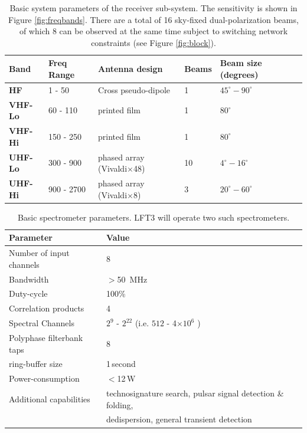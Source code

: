 \begin{table}
    \centering
    \caption{Basic system parameters of the receiver sub-system.  The sensitivity is shown in Figure \ref{fig:freqbands}. There are a total of 16 sky-fixed dual-polarization beams, of which 8 can be observed at the same time subject to switching network constraints (see Figure \ref{fig:block}).}
    \label{tab:bandparam}
    \begin{tabular}{|l|l|l|l|l|l|} \hline
    \textbf{Band} & \textbf{Freq Range} & \textbf{Antenna design} & \textbf{Beams} & \textbf{Beam size (degrees)} \\ \hline
    \textbf{HF} & 1 - 50  &  Cross pseudo-dipole  & 1&  $45^\circ-90^\circ$ \\ \hline
    \textbf{VHF-Lo} & 60 - 110 & printed film &  1 & $80^\circ$ \\ \hline
    \textbf{VHF-Hi} & 150 - 250 & printed film & 1 & $80^\circ$  \\ \hline
    \textbf{UHF-Lo} & 300 - 900 & phased array (Vivaldi$\times$48) & 10 & $4^\circ-16^\circ$\\ \hline
    \textbf{UHF-Hi} & 900 - 2700 & phased array (Vivaldi$\times$8) & 3 & $20^\circ-60^\circ$ \\ \hline
    \end{tabular}
\end{table}

\begin{table}
\centering
\caption{Basic spectrometer parameters. LFT3 will operate two such spectrometers. \label{tab:spectrometer}}
\begin{tabular}{|l|l|} \hline
\textbf{Parameter} & Value  \\ \hline
Number of input channels & 8 \\ \hline
Bandwidth & $>$50\, MHz \\ \hline
Duty-cycle & 100\% \\ \hline
Correlation products & 4  \\ \hline
Spectral Channels & $2^{9}$ - $2^{22}$  (i.e. $512$ - 4$\times 10^6$ ) \\ \hline
Polyphase filterbank taps & 8 \\ \hline
ring-buffer size & 1\,second \\ \hline
Power-consumption & $<$12\,W \\ \hline
Additional capabilities &  technosignature search, pulsar signal detection \& folding, \\
& dedispersion, general transient detection\\ \hline
\end{tabular}
\end{table}


